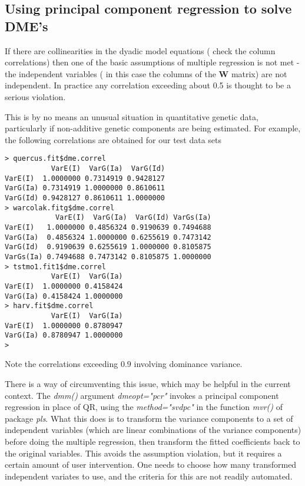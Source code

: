 \documentclass[titlepage]{article}  %
\begin{document}
\subsection{Using principal component regression to solve DME's}
\label{pcreg}

If there are collinearities in the dyadic model equations ( check the column correlations) then one of the basic assumptions of multiple regression is not met - the independent variables ( in this case the columns of the $\bm{W}$ matrix) are not independent. In practice any correlation exceeding about 0.5 is thought to be a serious violation.

This is by no means an unusual situation in quantitative genetic data, particularly if non-additive genetic components are being estimated. For example, the following correlations are obtained for our test data sets

\begin{verbatim}
> quercus.fit$dme.correl
           VarE(I)  VarG(Ia)  VarG(Id)
VarE(I)  1.0000000 0.7314919 0.9428127
VarG(Ia) 0.7314919 1.0000000 0.8610611
VarG(Id) 0.9428127 0.8610611 1.0000000
> warcolak.fitg$dme.correl
            VarE(I)  VarG(Ia)  VarG(Id) VarGs(Ia)
VarE(I)   1.0000000 0.4856324 0.9190639 0.7494688
VarG(Ia)  0.4856324 1.0000000 0.6255619 0.7473142
VarG(Id)  0.9190639 0.6255619 1.0000000 0.8105875
VarGs(Ia) 0.7494688 0.7473142 0.8105875 1.0000000
> tstmo1.fit1$dme.correl
           VarE(I)  VarG(Ia)
VarE(I)  1.0000000 0.4158424
VarG(Ia) 0.4158424 1.0000000
> harv.fit$dme.correl
           VarE(I)  VarG(Ia)
VarE(I)  1.0000000 0.8780947
VarG(Ia) 0.8780947 1.0000000
> 
\end{verbatim}

Note the correlations exceeding $0.9$ involving dominance variance.

There is a way of circumventing this issue, which may be helpful in the current context. The {\em dmm()} argument {\em dmeopt="pcr"} invokes a principal component regression in place of QR, using the {\em method="svdpc"} in the function {\em mvr()} of package {\em pls}.
What this does is to transform the variance components to a set of independent variables (which are linear combinations of the variance components) before doing the multiple regression, then transform the fitted coefficients back to the original variables. This avoids the assumption violation, but it requires a certain amount of user intervention. One needs to choose how many transformed independent variates to use, and the criteria for this are not readily automated.
\end{document}
